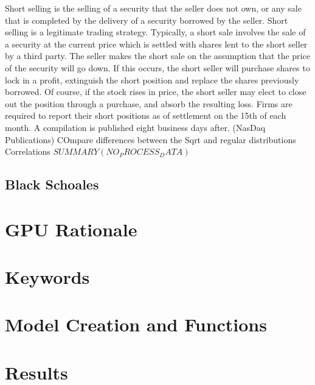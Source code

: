 \documentclass[paper=letter, fontsize=11pt]{scrartcl}
\numberwithin{equation}{section}		%
\numberwithin{figure}{section}			%
\numberwithin{table}{section}				%
\begin{document}
\begin{spacing}{2}
Short selling is the selling of a security that the seller does not own, or any sale that is completed by the delivery of a security borrowed by the seller. Short selling is a legitimate trading strategy. Typically, a short sale involves the sale of a security at the current price which is settled with shares lent to the short seller by a third party. The seller makes the short sale on the assumption that the price of the security will go down. If this occurs, the short seller will purchase shares to lock in a profit, extinguish the short position and replace the shares previously borrowed. Of course, if the stock rises in price, the short seller may elect to close out the position through a purchase, and absorb the resulting loss. Firms are required to report their short positions as of settlement on the 15th of each month. A compilation is published eight business days after.
(NasDaq Publications)
COmpare differences between the Sqrt and regular distributions
Correlations
$SUMMARY(NO_PROCESS_DATA)$


\subsection{Black Schoales}
\section{GPU Rationale}
\section{Keywords}
\section{Model Creation and Functions}
\section{Results}





\end{spacing}

 
\end{document}
